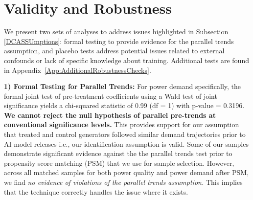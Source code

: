 \documentclass[sigconf,authordraft]{acmart}
\newcommand{\nb}[1]{\textcolor{blue}{NB[#1]}}
\begin{document}
\section{Validity and Robustness}\label{Robustness}
We present two sets of analyses to address issues highlighted in Subsection \ref{DCASSUmptions}: formal testing to provide evidence for the parallel trends assumption, and placebo tests address potential issues related to external confounds or lack of specific knowledge about training. Additional tests are found in Appendix~\ref{App:AdditionalRobustnessChecks}.

\noindent\textbf{1) Formal Testing for Parallel Trends: } For power demand specifically, the formal joint test of pre-treatment coefficients using a Wald test of joint significance yields a chi-squared statistic of 0.99 (df = 1) with p-value = 0.3196. \textbf{We cannot reject the null hypothesis of parallel pre-trends at conventional significance levels.} This provides support for our assumption that treated and control generators followed similar demand trajectories prior to AI model releases i.e., our identification assumption is valid. Some of our samples demonstrate significant evidence against the the parallel trends test prior to propensity score matching (PSM) that we use for sample selection. However, across all matched samples for both power quality and power demand after PSM, we find \textit{no evidence of violations of the parallel trends assumption.}
This implies that the technique correctly handles the issue where it exists. 
 
\end{document}
